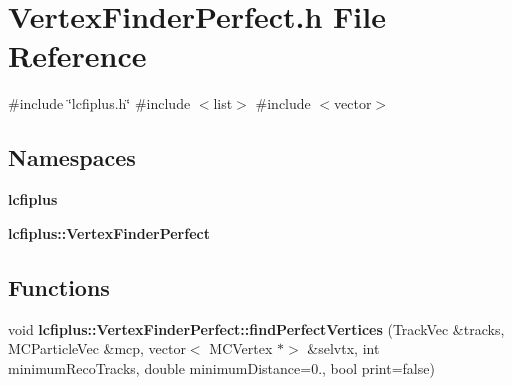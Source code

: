 \section{Vertex\+Finder\+Perfect.\+h File Reference}
\label{VertexFinderPerfect_8h}
{\ttfamily \#include \char`\"{}lcfiplus.\+h\char`\"{}}\newline
{\ttfamily \#include $<$list$>$}\newline
{\ttfamily \#include $<$vector$>$}\newline
\subsection*{Namespaces}
\begin{DoxyCompactItemize}
\item 
 \textbf{ lcfiplus}
\item 
 \textbf{ lcfiplus\+::\+Vertex\+Finder\+Perfect}
\end{DoxyCompactItemize}
\subsection*{Functions}
\begin{DoxyCompactItemize}
\item 
void \textbf{ lcfiplus\+::\+Vertex\+Finder\+Perfect\+::find\+Perfect\+Vertices} (Track\+Vec \&tracks, M\+C\+Particle\+Vec \&mcp, vector$<$ M\+C\+Vertex $\ast$$>$ \&selvtx, int minimum\+Reco\+Tracks, double minimum\+Distance=0., bool print=false)
\end{DoxyCompactItemize}
